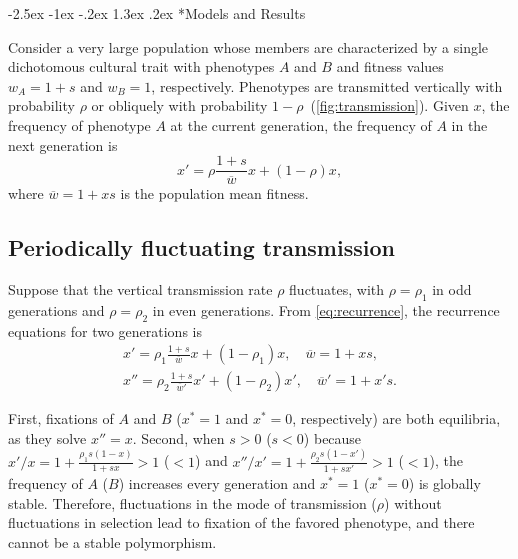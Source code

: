 \documentclass[14pt]{extarticle}
\makeatletter
\renewcommand\section{\@startsection {section}{1}{\z@}%
     {-2.5ex \@plus -1ex \@minus -.2ex}%
     {1.3ex \@plus.2ex}%
    {\Large\bfseries}}
\makeatother
\begin{document}
\section*{Models and Results}

Consider a very large population whose members are characterized by a single dichotomous cultural trait with phenotypes $A$ and $B$ and fitness values $w_A=1+s$ and $w_B=1$, respectively.
Phenotypes are transmitted vertically with probability $\rho$ or obliquely with probability $1-\rho$~(\autoref{fig:transmission}).
Given $x$, the frequency of phenotype $A$ at the current generation, the frequency of $A$ in the next generation is
\begin{equation} \label{eq:recurrence}
x' = \rho \frac{1+s}{\overline w} x + (1-\rho)x,
\end{equation}
where $\overline w = 1 + xs$ is the population mean fitness.

\subsection*{Periodically fluctuating transmission}

Suppose that the vertical transmission rate $\rho$ fluctuates, with $\rho = \rho_1$ in odd generations and $\rho = \rho_2$ in even generations.
From \eqref{eq:recurrence}, the recurrence equations for two generations is
\begin{equation}\begin{aligned} \label{eq:recurrence_two_generations}
x' = \rho_1 \frac{1+s}{\overline w} x + (1-\rho_1)x, \quad \overline w = 1 + xs, \\
x'' = \rho_2 \frac{1+s}{\overline w'} x' + (1-\rho_2)x', \quad \overline w' = 1 + x's.
\end{aligned}\end{equation}

First, fixations of $A$ and $B$ ($x^*=1$ and $x^*=0$, respectively) are both equilibria, as they solve $x''=x$.
Second, when $s>0$ ($s<0$) because $x'/x = 1+\frac{\rho_1 s (1-x)}{1+sx} > 1$ ($<1$) and $x''/x' = 1+\frac{\rho_2 s (1-x')}{1+sx'} > 1$ ($<1$), the frequency of $A$ ($B$) increases every generation and $x^*=1$ ($x^*=0$) is globally stable.
Therefore, fluctuations in the mode of transmission ($\rho$) without fluctuations in selection lead to fixation of the favored phenotype, and there cannot be a stable polymorphism.

\end{document}
